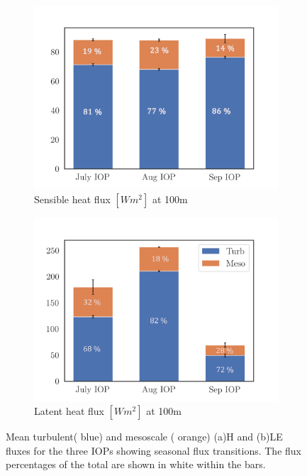 \documentclass[draft]{agujournal2019}
\begin{document}
\begin{figure}[hbtp]
     \begin{subfigure}[b]{0.5\textwidth}
         \centering
         \includegraphics[width=\textwidth]{H_IOP_100.png}
         \caption{Sensible heat flux $[W m^{2}]$ at 100m}
         \label{fig:H_IOP_100}
     \end{subfigure}
     \begin{subfigure}[b]{0.5\textwidth}
         \includegraphics[width=\textwidth]{LE_IOP_100.png}
         \caption{Latent heat flux $[W m^{2}]$ at 100m}
         \label{fig:LE_IOP_100}
     \end{subfigure}
        \caption{Mean turbulent( blue) and mesoscale ( orange)  (a)H and (b)LE fluxes for the three IOPs showing seasonal flux transitions. The flux percentages of the total are shown in white within the bars.}
        \label{fig:IOP_100}
\end{figure} 
\end{document}
